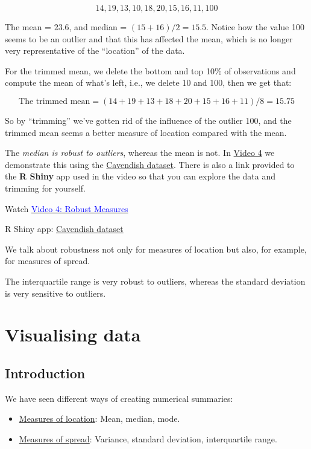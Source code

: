 \documentclass[
]{book}
\providecommand{\tightlist}{%
  \setlength{\itemsep}{0pt}\setlength{\parskip}{0pt}}
\begin{document}
\[14, 19, 13, 10, 18, 20, 15, 16, 11, 100\]

The mean = \(23.6\), and median = \((15+16)/2 = 15.5\). Notice how the value
100 seems to be an outlier and that this has affected the mean, which is no longer very
representative of the ``location'' of the data.

For the trimmed mean, we delete the bottom and top 10\% of observations and compute the mean of what's left, i.e., we
delete 10 and 100, then we get that:

\[\mbox{The trimmed mean}=(14+ 19+ 13+ 18+ 20+ 15+ 16+ 11)/8= 15.75\]

So by ``trimming'' we've gotten rid of the influence of the outlier 100, and the trimmed mean
seems a better measure of location compared with the mean.

The \emph{median is robust to outliers}, whereas the mean is not. In \protect\hyperlink{video4}{Video 4} we demonstrate this using the \protect\hyperlink{intro_example}{Cavendish dataset}. There is also a link provided to the \textbf{R Shiny} app used in the video so that you can explore the data and trimming for yourself.

Watch \href{https://mediaspace.nottingham.ac.uk/media/Robust+Measures+FINAL+VERSION/1_qfg4edmo}{\textcolor{blue}{Video 4: Robust Measures}}

R Shiny app: \href{https://shiny-new.maths.nottingham.ac.uk/pmzpn/Cavendish/}{Cavendish dataset}

We talk about robustness not only for measures of location but also, for
example, for measures of spread.

The interquartile range is very robust to outliers, whereas the
standard deviation is very sensitive to outliers.

\hypertarget{visual}{%
\chapter{Visualising data}\label{visual}}

\hypertarget{visual_intro}{%
\section{Introduction}\label{visual_intro}}

We have seen different ways of creating numerical summaries:

\begin{itemize}
\tightlist
\item
  \protect\hyperlink{summary_location}{Measures of location}: Mean, median, mode.\\
\item
  \protect\hyperlink{summary_spread}{Measures of spread}: Variance, standard deviation, interquartile range.
\end{itemize}
\end{document}
